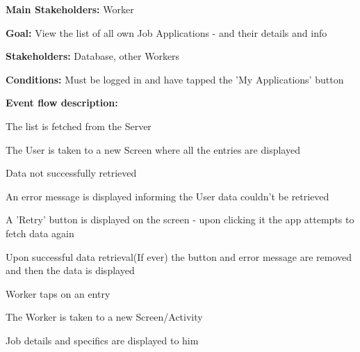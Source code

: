 			\noindent {}
			\begin{packed_item}
				\item \textbf{Main Stakeholders:} Worker
				\item \textbf{Goal:} View the list of all own Job Applications - and their details and info
				\item \textbf{Stakeholders: } Database, other Workers
				\item \textbf{Conditions: } Must be logged in and have tapped the 'My Applications' button
				\item \textbf{Event flow description: }
				\begin{packed_enum}
					\item The list is fetched from the Server
					\item The User is taken to a new Screen where all the entries are displayed
				\end{packed_enum}
				
				\begin{packed_item}
					\item[0.a] Data not successfully retrieved
					\item[] \begin{packed_enum}
						\item An error message is displayed informing the User data couldn't be retrieved
						\item A 'Retry' button is displayed on the screen - upon clicking it the app attempts to fetch data again
						\item Upon successful data retrieval(If ever) the button and error message are removed and then the data is displayed
					\end{packed_enum}
				
					\item[1.a] Worker taps on an entry
					\item[] \begin{packed_enum}
						\item The Worker is taken to a new Screen/Activity
						\item Job details and specifics are displayed to him
					\end{packed_enum}
				\end{packed_item}
			\end{packed_item}
			
